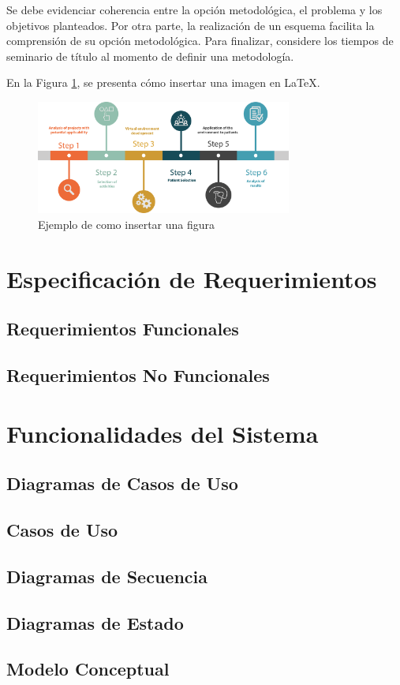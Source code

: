 Se debe evidenciar coherencia entre la opción metodológica, el problema y los objetivos planteados.
Por otra parte, la realización de un esquema facilita la comprensión de su opción metodológica. Para finalizar, considere los tiempos de seminario de título al momento de definir una metodología.


En la Figura \ref{fig:met}, se presenta cómo insertar una imagen en \LaTeX{}.
\begin{figure}[H]
    \centering
    \includegraphics[width=0.75\textwidth]{imagenes/Fig_ejMet.png}
    \caption{Ejemplo de como insertar una figura}
    \label{fig:met}
\end{figure}



\section{Especificación de Requerimientos}
\label{sc:ER}


\subsection{Requerimientos Funcionales}
\label{ssc:RF}


\subsection{Requerimientos No Funcionales}
\label{ssc:RNF}
\section{Funcionalidades del Sistema}
\label{sc:FS}


\subsection{Diagramas de Casos de Uso}
\label{ssc:DCU}


\subsection{Casos de Uso}
\label{ssc:CU}

\subsection{Diagramas de Secuencia}
\label{ssc:DSS}

\subsection{Diagramas de Estado}
\label{ssc:DE}


\subsection{Modelo Conceptual}
\label{ssc:MC}